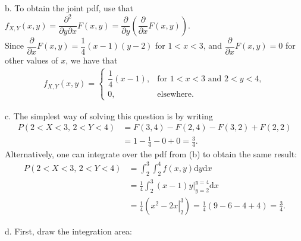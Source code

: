 \begin{exercise}
\begin{solution}
b.             To obtain the joint pdf, use that $f_{X,Y}(x,y) = \dfrac{\partial^2}{\partial y\partial x}F(x,y) = \dfrac{\partial}{\partial y}\left(\dfrac{\partial}{\partial x} F(x,y)\right)$.\\
            Since
            $\dfrac{\partial}{\partial x} F(x,y) = \dfrac{1}{4}(x-1)(y-2)$ for $1< x < 3$, and $\dfrac{\partial}{\partial x} F(x,y) = 0$ for other values of $x$, we have that
            \begin{align*}
                f_{X,Y}(x,y) = \begin{cases}
                    \dfrac{1}{4}(x-1), & \mbox{for } 1<x<3 \mbox{ and } 2<y<4,\\
                    0, & \mbox{elsewhere}.
                \end{cases}
            \end{align*}

c.            The simplest way of solving this question is by writing
            \begin{align*}
                P(2<X<3,\, 2<Y<4) &= F(3,4) - F(2,4) - F(3,2) + F(2,2) \\
                &= 1 - \frac{1}{4} -0 + 0 = \frac{3}{4}.
            \end{align*}
            Alternatively, one can integrate over the pdf from (b) to obtain the same result:
            \begin{align*}
                P(2<X<3,\, 2<Y<4) &= \int_2^3\int_2^4f(x,y)\text{d}y\text{d}x\\
                &=\frac{1}{4}\int_2^3\left.(x-1)y\right|_{y=2}^{y=4}\text{d}x\\
                &=\frac{1}{4}\left(\left.x^2-2x\right|_2^3\right) = \frac{1}{4}\left(9-6-4+4\right) = \frac{3}{4}.
            \end{align*}


d.     First, draw the integration area:
            \begin{center}
\end{center}
\end{solution}
\end{exercise}
